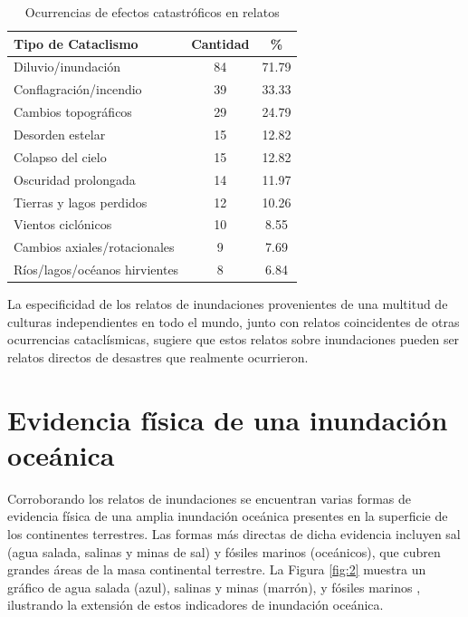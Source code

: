 \documentclass[10pt,twocolumn,letterpaper]{article}
\begin{document}
\begin{table}[ht]
\begin{center}
\renewcommand{\arraystretch}{1.2}  %
\begin{tabular}{|l|c|c|}
\hline
\textbf{Tipo de Cataclismo} & \textbf{Cantidad} & \textbf{\%} \\
\hline\hline
Diluvio/inundación            & 84 & 71.79 \\
Conflagración/incendio        & 39 & 33.33 \\
Cambios topográficos          & 29 & 24.79 \\
Desorden estelar              & 15 & 12.82 \\
Colapso del cielo             & 15 & 12.82 \\
Oscuridad prolongada          & 14 & 11.97 \\

Tierras y lagos perdidos    & 12 & 10.26 \\
Vientos ciclónicos          & 10 & 8.55  \\
Cambios axiales/rotacionales & 9 & 7.69  \\
Ríos/lagos/océanos hirvientes & 8 & 6.84 \\
\hline
\end{tabular}
\end{center}
\caption{Ocurrencias de efectos catastróficos en relatos}
\label{tab: 1}
\end{table}

La especificidad de los relatos de inundaciones provenientes de una multitud de culturas independientes en todo el mundo, junto con relatos coincidentes de otras ocurrencias cataclísmicas, sugiere que estos relatos sobre inundaciones pueden ser relatos directos de desastres que realmente ocurrieron.

\section{Evidencia física de una inundación oceánica}

Corroborando los relatos de inundaciones se encuentran varias formas de evidencia física de una amplia inundación oceánica presentes en la superficie de los continentes terrestres. Las formas más directas de dicha evidencia incluyen sal (agua salada, salinas y minas de sal) y fósiles marinos (oceánicos), que cubren grandes áreas de la masa continental terrestre. La Figura \ref{fig:2} muestra un gráfico de agua salada (azul), salinas y minas (marrón), y fósiles marinos \cite{15,16,86,87}, ilustrando la extensión de estos indicadores de inundación oceánica.
\end{document}
